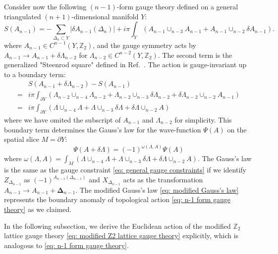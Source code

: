 \documentclass[12pt]{article}
\newcommand{\ZZ}{{\mathbb Z}}
\newcommand{\ra}{\rightarrow}
\begin{document}
Consider now the following $(n-1)$-form gauge theory defined on a general triangulated $(n+1)$-dimensional manifold $Y$:
\begin{equation}
S(A_{n-1})= -\sum_{\Delta_{n} \subset Y} |\delta A_{n-1} (\Delta_{n})| + i \pi \int_Y (A_{n-1} \cup_{n-3} A_{n-1} + A_{n-1} \cup_{n-2} \delta A_{n-1}).
\label{eq: n-1 form gauge theory}
\end{equation}
where $A_{n-1}\in C^{n-1}(Y,\ZZ_2)$, and the gauge symmetry acts by $A_{n-1} \rightarrow A_{n-1} + \delta \Lambda_{n-2}$ for $\Lambda_{n-2} \in C^{n-2}(Y,\ZZ_2)$. The second term is the generalized "Steenrod square" defined in Ref.~\cite{LZW18}. The action is gauge-invariant up to a boundary term:
\begin{equation}
    \begin{split}
        &S(A_{n-1} + \delta \Lambda_{n-2}) - S(A_{n-1}) \\
        =& i \pi \int_{\partial Y} ( \Lambda_{n-2} \cup_{n-4} \Lambda_{n-2} + \Lambda_{n-2} \cup_{n-3} \delta \Lambda_{n-2} + \delta \Lambda_{n-2} \cup_{n-2} A_{n-1}) \\
        =& i \pi \int_{\partial Y} ( \Lambda \cup_{n-4} \Lambda + \Lambda \cup_{n-3} \delta \Lambda + \delta \Lambda \cup_{n-2} A)
    \end{split}
\label{eq:Ssimple boundary}
\end{equation}
where we have omited the subscript of $A_{n-1}$ and $\Lambda_{n-2}$ for simplicity.
This boundary term determines the Gauss's law for the wave-function $\Psi(A)$ on the spatial slice $M=\partial Y$:
\begin{equation}
\Psi(A + \delta \Lambda) = (-1)^{\omega(\Lambda,A)} \Psi (A)
\end{equation}
where $\omega(\Lambda,A) = \int_{M} ( \Lambda \cup_{n-4} \Lambda + \Lambda \cup_{n-3} \delta \Lambda + \delta \Lambda \cup_{n-2} A)$. The Gauss's law is the same as the gauge constraint \eqref{eq: general gauge constraints} if we identify $Z_{\Delta_{n-1}}$ as $(-1)^{A_{n-1} (\Delta_{n-1})}$ and $X_{\Delta_{n-1}}$ acts as the transformation $A_{n-1} \ra A_{n-1} + \boldsymbol \Delta_{n-1}$. The modified Gauss's law \eqref{eq: modified Gauss's law} represents the boundary anomaly of topological action \eqref{eq: n-1 form gauge theory} as we claimed.

In the following subsection, we derive the Euclidean action of the modified $\ZZ_2$ lattice gauge theory \eqref{eq: modified Z2 lattice gauge theory} explicitly, which is analogous to \eqref{eq: n-1 form gauge theory}. 
\end{document}
